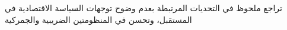 تراجع ملحوظ في التحديات المرتبطة بعدم وضوح توجهات السياسة الاقتصادية في المستقبل، وتحسن في المنظومتين الضريبية والجمركية
